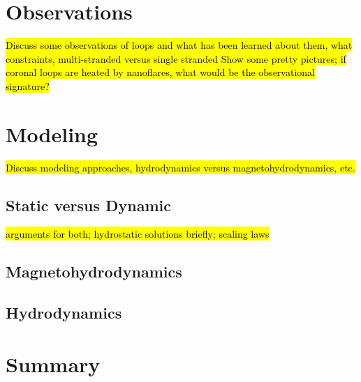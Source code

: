 \section{Observations}
\label{sec:observations}
\hl{Discuss some observations of loops and what has been learned about them, what constraints, multi-stranded versus single stranded
Show some pretty pictures; if coronal loops are heated by nanoflares, what would be the observational signature?}
\section{Modeling}
\label{sec:modeling}
\hl{Discuss modeling approaches, hydrodynamics versus magnetohydrodynamics, etc.}
\subsection{Static versus Dynamic}
\hl{arguments for both; hydrostatic solutions briefly; scaling laws}
\subsection{Magnetohydrodynamics}
\subsection{Hydrodynamics}
\section{Summary}
